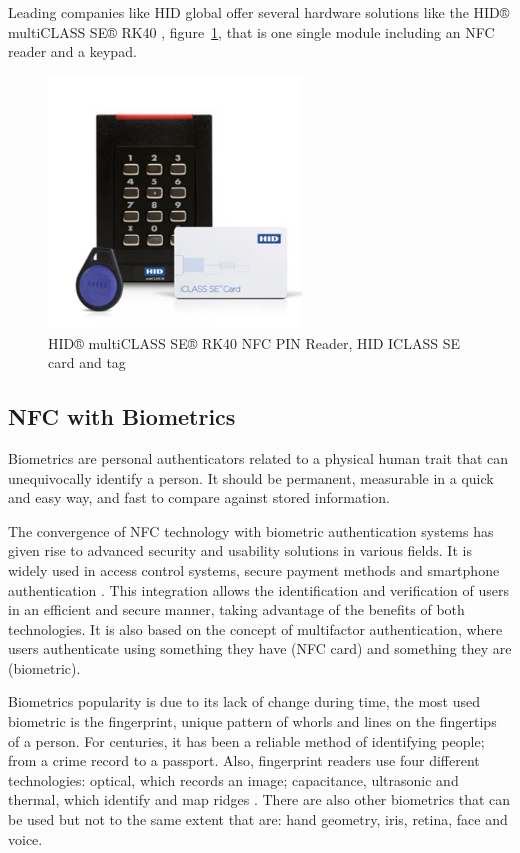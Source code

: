 Leading companies like HID global offer several hardware solutions like the HID® multiCLASS SE® RK40 \cite{ref75}, figure~\ref{fig:hid_multiclass}, that is one single module including an NFC reader and a keypad.

\begin{figure}[h!]
	\includegraphics[width=0.6\textwidth]{imaxes/pinhid.png} 
	\caption{HID® multiCLASS SE® RK40 NFC PIN Reader, HID ICLASS SE card and tag}
	\label{fig:hid_multiclass}
\end{figure}

\subsection{NFC with Biometrics}

Biometrics are personal authenticators related to a physical human trait that can unequivocally identify a person. It should be permanent, measurable in a quick and easy way, and fast to compare against stored information.

The convergence of NFC technology with biometric authentication systems has given rise to advanced security and usability solutions in various fields. It is widely used in access control systems, secure payment methods and smartphone authentication \cite{ref83}. This integration allows the identification and verification of users in an efficient and secure manner, taking advantage of the benefits of both technologies. It is also based on the concept of multifactor authentication, where users authenticate using something they have (NFC card) and something they are (biometric).

Biometrics popularity is due to its lack of change during time, the most used biometric is the fingerprint, unique pattern of whorls and lines on the fingertips of a person. For centuries, it has been a reliable method of identifying people; from a crime record to a passport. Also, fingerprint readers use four different technologies: optical, which records an image; capacitance, ultrasonic and thermal, which identify and map ridges \cite{ref30}. There are also other biometrics that can be used but not to the same extent that are: hand geometry, iris, retina, face and voice.

